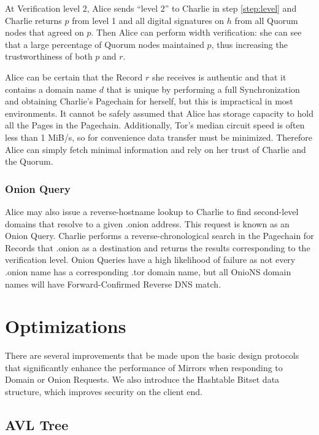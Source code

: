 At Verification level 2, Alice sends ``level 2'' to Charlie in step \ref{step:level} and Charlie returns $ p $ from level 1 and all digital signatures on $ h $ from all Quorum nodes that agreed on $ p $. Then Alice can perform width verification: she can see that a large percentage of Quorum nodes maintained $ p $, thus increasing the trustworthiness of both $ p $ and $ r $.

Alice can be certain that the Record $ r $ she receives is authentic and that it contains a domain name $ d $ that is unique by performing a full Synchronization and obtaining Charlie's Pagechain for herself, but this is impractical in most environments. It cannot be safely assumed that Alice has storage capacity to hold all the Pages in the Pagechain. Additionally, Tor's median circuit speed is often less than 1 MiB/s,\cite{TorMetrics} so for convenience data transfer must be minimized. Therefore Alice can simply fetch minimal information and rely on her trust of Charlie and the Quorum.

\subsubsection{Onion Query}

Alice may also issue a reverse-hostname lookup to Charlie to find second-level domains that resolve to a given .onion address. This request is known as an Onion Query. Charlie performs a reverse-chronological search in the Pagechain for Records that .onion as a destination and returns the results corresponding to the verification level. Onion Queries have a high likelihood of failure as not every .onion name has a corresponding .tor domain name, but all OnioNS domain names will have Forward-Confirmed Reverse DNS match.

\section{Optimizations}

There are several improvements that be made upon the basic design protocols that significantly enhance the performance of Mirrors when responding to Domain or Onion Requests. We also introduce the Hashtable Bitset data structure, which improves security on the client end.

\subsection{AVL Tree}

